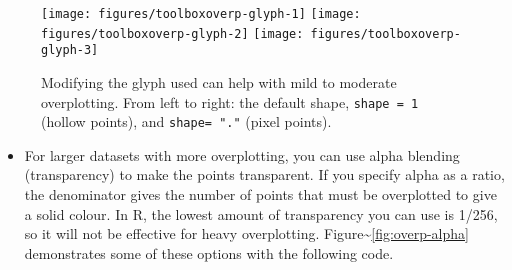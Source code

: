 \begin{Shaded}
\begin{Highlighting}[]
\StringTok{ }\NormalTok{(} \NormalTok{(}\NormalTok{), } \NormalTok{(}\NormalTok{))}
\StringTok{ }
\StringTok{ }\NormalTok{()}
\StringTok{ }\NormalTok{(} \NormalTok{)}
\StringTok{ }\NormalTok{(} \NormalTok{) }
\end{Highlighting}
\end{Shaded}

\begin{figure}
\texttt{[image: figures/toolboxoverp-glyph-1]} \texttt{[image: figures/toolboxoverp-glyph-2]} \texttt{[image: figures/toolboxoverp-glyph-3]} \caption{Modifying the glyph used can help with mild to moderate overplotting.  From left to right: the default shape, \texttt{shape = 1} (hollow points), and \texttt{shape= "."} (pixel points).\label{fig:overp-glyph}}
\end{figure}

\begin{itemize}
\itemsep1pt\parskip0pt
\item
  For larger datasets with more overplotting, you can use alpha blending
  (transparency) to make the points transparent. If you specify alpha as
  a ratio, the denominator gives the number of points that must be
  overplotted to give a solid colour. In R, the lowest amount of
  transparency you can use is 1/256, so it will not be effective for
  heavy overplotting. Figure\textasciitilde{}\ref{fig:overp-alpha}
  demonstrates some of these options with the following code.
    
\end{itemize}

\begin{Shaded}
\begin{Highlighting}[]
\StringTok{ }\NormalTok{(} \NormalTok{/}\NormalTok{)}
\StringTok{ }\NormalTok{(} \NormalTok{/}\NormalTok{)}
\StringTok{ }\NormalTok{(} \NormalTok{/}\NormalTok{)}
\end{Highlighting}
\end{Shaded}

